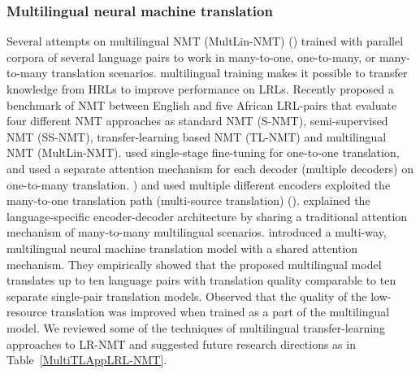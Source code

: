 \documentclass[manuscript,screen]{acmart}
\begin{document}
\subsubsection{\bf{Multilingual neural machine translation}}
Several attempts on multilingual NMT (MultLin-NMT) (\citet{dong2015multi,zoph2016transfer,firat2016multi,firat2016zero,johnson-etal-2017-googles,ha2toward,lee2017fully,gu2018universal,neubig2018rapid,nguyen2017transfer,lakew2018transfer,rikters2018training,aharoni2019massively,wang2019target,imankulova2019exploiting,hokamp2019evaluating,arcan2019inferring,vazquez2018multilingual,chaudhary2019low,chakravarthi2019multilingual,wang2020balancing,siddhant2020leveraging}) trained with parallel corpora of several language pairs to work in many-to-one, one-to-many, or many-to-many translation scenarios. multilingual training makes it possible to transfer knowledge from HRLs to improve performance on LRLs. Recently \citet{lakew2020low} proposed a benchmark of NMT between English and five African LRL-pairs that evaluate four different NMT approaches as standard NMT (S-NMT), semi-supervised NMT (SS-NMT), transfer-learning based NMT (TL-NMT) and multilingual NMT (MultLin-NMT). \citet{zoph2016transfer} used single-stage fine-tuning for one-to-one translation, and \citet{dong2015multi} used a separate attention mechanism for each decoder (multiple decoders) on one-to-many translation. \citet{zoph2016multi}) and \citet{firat2016zero} used multiple different encoders exploited the many-to-one translation path (multi-source translation) (\citet{pan2020multi}). \citet{firat2016multi} explained the language-specific encoder-decoder architecture by sharing a traditional attention mechanism of many-to-many multilingual scenarios. \citet{firat2017multi} introduced a multi-way, multilingual neural machine translation model with a shared attention mechanism. They empirically showed that the proposed multilingual model translates up to ten language pairs with translation quality comparable to ten separate single-pair translation models. Observed that the quality of the low-resource translation was improved when trained as a part of the multilingual model.
We reviewed some of the techniques of multilingual transfer-learning approaches to LR-NMT and suggested future research directions as in Table~\ref{MultiTLAppLRL-NMT}.
\end{document}
